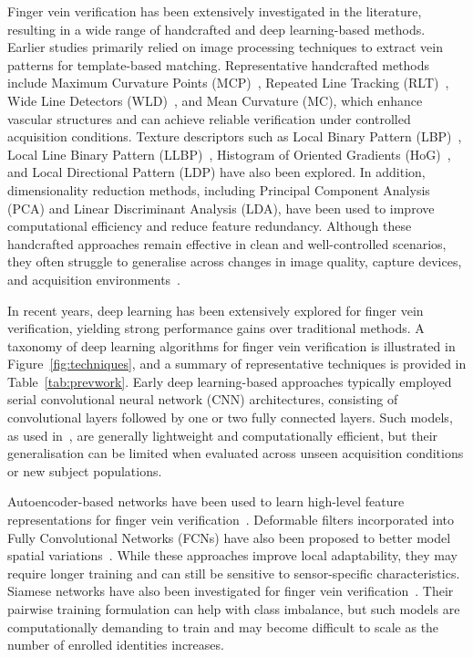 \documentclass[10pt,journal,compsoc]{IEEEtran}
\begin{document}
Finger vein verification has been extensively investigated in the literature, resulting in a wide range of handcrafted and deep learning-based methods. Earlier studies primarily relied on image processing techniques to extract vein patterns for template-based matching. Representative handcrafted methods include Maximum Curvature Points (MCP)~\cite{mcp}, Repeated Line Tracking (RLT)~\cite{rlt}, Wide Line Detectors (WLD)~\cite{wld}, and Mean Curvature (MC), which enhance vascular structures and can achieve reliable verification under controlled acquisition conditions. Texture descriptors such as Local Binary Pattern (LBP)~\cite{FV_LBPV}, Local Line Binary Pattern (LLBP)~\cite{rosdi2011finger}, Histogram of Oriented Gradients (HoG)~\cite{FV_HoG}, and Local Directional Pattern (LDP) have also been explored. In addition, dimensionality reduction methods, including Principal Component Analysis (PCA) and Linear Discriminant Analysis (LDA), have been used to improve computational efficiency and reduce feature redundancy. Although these handcrafted approaches remain effective in clean and well-controlled scenarios, they often struggle to generalise across changes in image quality, capture devices, and acquisition environments~\cite{surveyonmanualfeatures}.

In recent years, deep learning has been extensively explored for finger vein verification, yielding strong performance gains over traditional methods. A taxonomy of deep learning algorithms for finger vein verification is illustrated in Figure~\ref{fig:techniques}, and a summary of representative techniques is provided in Table~\ref{tab:prevwork}. Early deep learning-based approaches typically employed serial convolutional neural network (CNN) architectures, consisting of convolutional layers followed by one or two fully connected layers. Such models, as used in~\cite{2015_1, 2016_1, 2016_2, 2017_1,2017_2, 2018_1, 2019_2, 2020_2, 2020_3, 2021_1, 2021_2,chenresnetarcloss,  2022_1, 2022_3, ism}, are generally lightweight and computationally efficient, but their generalisation can be limited when evaluated across unseen acquisition conditions or new subject populations.

Autoencoder-based networks have been used to learn high-level feature representations for finger vein verification~\cite{2019_4, 2019_5}. Deformable filters incorporated into Fully Convolutional Networks (FCNs) have also been proposed to better model spatial variations~\cite{2020_1}. While these approaches improve local adaptability, they may require longer training and can still be sensitive to sensor-specific characteristics. Siamese networks have also been investigated for finger vein verification~\cite{2019_1, 2019_3, 2023_3}. Their pairwise training formulation can help with class imbalance, but such models are computationally demanding to train and may become difficult to scale as the number of enrolled identities increases.
\end{document}
